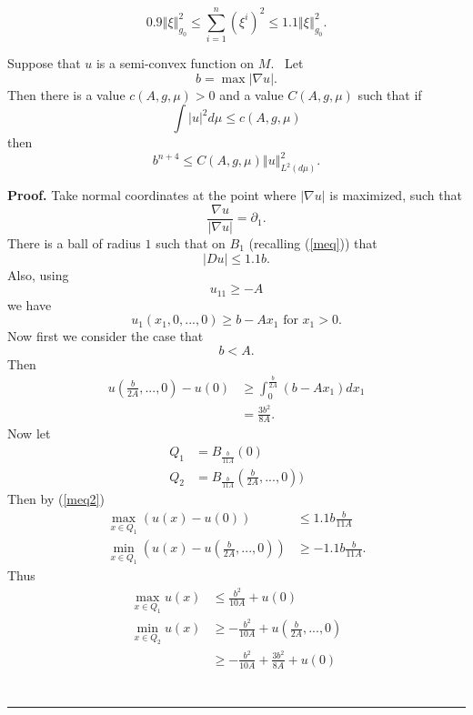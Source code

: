 \documentclass[10pt,a4paper]{amsart}
\newenvironment{proof}[1][Proof]{\noindent\textbf{#1.} }{\ \rule{0.5em}{0.5em}}
\begin{document}
\begin{equation}
0.9\left\Vert \xi\right\Vert _{g_{0}}^{2}\leq\sum_{i=1}^{n}\left(  \xi
^{i}\right)  ^{2}\leq1.1\left\Vert \xi\right\Vert _{g_{0}}^{2} \label{meq}.%
\end{equation}

\begin{proposition}
\label{bbbb}Suppose that $u$ is a semi-convex function on $M$. \ Let
\[
b=\max\left\vert \nabla u\right\vert .
\]
Then there is a value $c(A,g,\mu)>0$ and a value $C(A,g,\mu)$ such that if
\[
\int\left\vert u\right\vert ^{2}d\mu\leq c(A,g,\mu)
\]
then
\[
b^{n+4}\leq C(A,g,\mu)\left\Vert u\right\Vert _{L^{2}(d\mu)}^{2}.
\]

\end{proposition}

\begin{proof}
Take normal coordinates at the point where $\left\vert \nabla u\right\vert $
is maximized, such that
\[
\frac{\nabla u}{\left\vert \nabla u\right\vert }=\partial_{1}.%
\]
There is a ball of radius $1$ such that on $B_{1}$ (recalling (\ref{meq})) that
\begin{equation}
\left\vert Du\right\vert \leq1.1b \label{meq2}.%
\end{equation}
Also, using
\[
u_{11}\geq-A
\]
we have
\[
u_{1}(x_{1},0,...,0)\geq b-Ax_{1}\text{ for }x_{1}>0.
\]
Now first we consider the case that
\[
b<A.
\]
Then
\begin{align*}
u(\frac{b}{2A},...,0)-u(0)  &  \geq\int_{0}^{\frac{b}{2A}}\left(
b-Ax_{1}\right)  dx_{1}\\
&  =\frac{3b^{2}}{8A}.
\end{align*}
Now let
\begin{align*}
Q_{1}  &  =B_{\frac{b}{11A}}(0)\\
Q_{2}  &  =B_{\frac{b}{11A}}(\frac{b}{2A},...,0))
\end{align*}
Then by (\ref{meq2})
\begin{align*}
\max_{x\in Q_{1}}\left(  u(x)-u(0)\right)   &  \leq1.1b\frac{b}{11A}\\
\min_{x\in Q_{1}}\left(  u(x)-u(\frac{b}{2A},...,0)\right)   &  \geq
-1.1b\frac{b}{11A}.%
\end{align*}
Thus
\begin{align*}
\max_{x\in Q_{1}}u(x)  &  \leq\frac{b^{2}}{10A}+u(0)\\
\min_{x\in Q_{2}}u(x)  &  \geq-\frac{b^{2}}{10A}+u(\frac{b}{2A},...,0)\\
&  \geq-\frac{b^{2}}{10A}+\frac{3b^{2}}{8A}+u(0)\\

\end{align*}
\end{proof}
\end{document}
